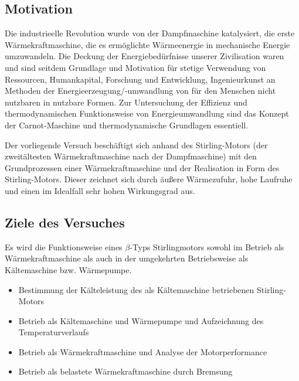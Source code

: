 \subsection{Motivation}
Die industrieelle Revolution wurde von der Dampfmaschine katalysiert, die erste Wärmekraftmaschine, die es ermöglichte Wärmeenergie in mechanische Energie umzuwandeln. Die Deckung der Energiebedürfnisse unserer Zivilisation waren und sind seitdem Grundlage und Motivation für stetige Verwendung von Ressourcen, Humankapital, Forschung und Entwicklung, Ingenieurkunst an Methoden der Energieerzeugung/-umwandlung von für den Menschen nicht nutzbaren in nutzbare Formen. 
Zur Untersuchung der Effizienz und thermodynamischen Funktionsweise von Energieumwandlung sind das Konzept der Carnot-Maschine und thermodynamische Grundlagen essentiell. 

Der vorliegende Versuch beschäftigt sich anhand des Stirling-Motors (der zweitältesten Wärmekraftmaschine nach der Dampfmaschine) mit den Grundprozessen einer Wärmekraftmaschine und der Realisation in Form des Stirling-Motors. Dieser zeichnet sich durch äußere Wärmezufuhr, hohe Laufruhe und einen im Idealfall sehr hohen Wirkungsgrad aus.

\subsection{Ziele des Versuches}
Es wird die Funktionsweise eines \(\beta\)-Typs Stirlingmotors sowohl im Betrieb als Wärmekraftmaschine als auch in der umgekehrten Betriebsweise als Kältemaschine bzw. Wärmepumpe. 
\begin{itemize}
    \item Bestimmung der Kälteleistung des als Kältemaschine betriebenen Stirling-Motors
    \item Betrieb als Kältemaschine und Wärmepumpe und Aufzeichnung des Temperaturverlaufs
    \item Betrieb als Wärmekraftmaschine und Analyse der Motorperformance
    \item Betrieb als belastete Wärmekraftmaschine durch Bremsung
\end{itemize}

